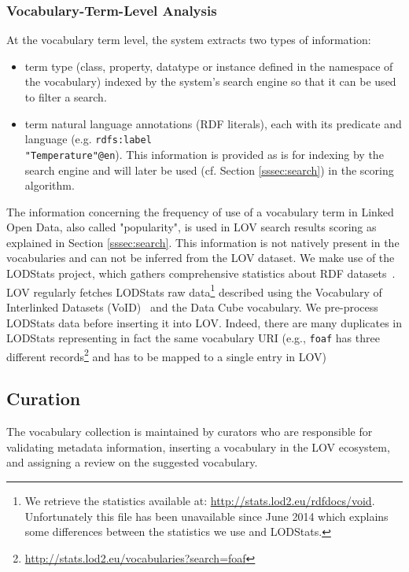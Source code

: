 \documentclass{iosart2c}
\begin{document}
\subsubsection{Vocabulary-Term-Level Analysis}
At the vocabulary term level, the system extracts two types of information:
\begin{itemize}
\item term type (class, property, datatype or instance defined in the namespace of the vocabulary) indexed by the system's search engine so that it can be used to filter a search.
\item term natural language annotations (RDF literals), each with its predicate and language (e.g. {\small\texttt{rdfs:label}}\\ {\small\texttt{"Temperature"@en}}). This information is provided as is for indexing by the search engine and will later be used (cf. Section \ref{sssec:search}) in the scoring algorithm.
\end{itemize}

The information concerning the frequency of use of a vocabulary term in Linked Open Data, also called "popularity", is used in LOV search results scoring as explained in Section \ref{sssec:search}. This information is not natively present in the vocabularies and can not be inferred from the LOV dataset. We make use of the LODStats project, which gathers comprehensive statistics about RDF datasets~\cite{demter-2012-ekaw}. LOV regularly fetches LODStats raw data\footnote{We retrieve the statistics available at: \url{http://stats.lod2.eu/rdfdocs/void}. Unfortunately this file has been unavailable since June 2014 which explains some differences between the statistics we use and LODStats.} described using the Vocabulary of Interlinked Datasets (VoID)~\cite{void2009} and the Data Cube vocabulary. We pre-process LODStats data before inserting it into LOV. Indeed, there are many duplicates in LODStats representing in fact the same vocabulary URI (e.g., \texttt{foaf} has three different records\footnote{\url{http://stats.lod2.eu/vocabularies?search=foaf}} and has to be mapped to a single entry in LOV)


\subsection{Curation}
The vocabulary collection is maintained by curators who are responsible for validating metadata information, inserting a vocabulary in the LOV ecosystem, and assigning a review on the suggested vocabulary. 
\end{document}
